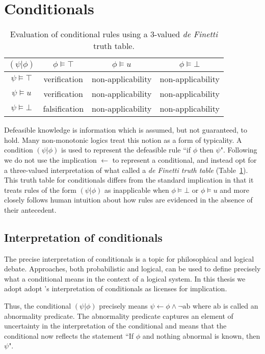 \section{Conditionals} \label{ssec:condi}
\begin{table}
\begin{center}
\begin{tabular}{ c | c c c }
  $(\psi|\phi)$& $\phi\models \top$ & $\phi \models u$ & $\phi \models \bot$ \\ \hline
 $\psi\models \top$ & verification &  non-applicability & non-applicability \\  
  $\psi\models u$ & verification &  non-applicability & non-applicability \\ 
 $\psi \models \bot$ & falsification &  non-applicability & non-applicability
\end{tabular}
\caption{Evaluation of conditional rules using a 3-valued \textit{de Finetti} truth table.}
\label{tbl:cond}
\end{center}
\end{table}

Defeasible knowledge is information which is assumed, but not guaranteed, to hold. Many non-monotonic logics treat this notion as a form of typicality. A condition $(\psi|\phi)$ is used to represent the defeasible rule ``if $\phi$ then $\psi$". Following \cite{wason1968reasoning} we do not use the implication $\leftarrow$ to represent a conditional, and instead opt for a three-valued interpretation of what \cite{baratgin2014new} called a \textit{de Finetti truth table} (Table~\ref{tbl:cond}). This truth table for conditionals differs from the standard implication in that it treats rules of the form $(\psi|\phi)$ as inapplicable when $\phi \models \bot$ or $\phi \models u$ and more closely follows human intuition about how rules are evidenced in the absence of their antecedent.

\subsection{Interpretation of conditionals} \label{ssec:condInterpretation}
The precise interpretation of conditionals is a topic for philosophical and logical debate. Approaches, both probabilistic and logical, can be used to define precisely what a conditional means in the context of a logical system. In this thesis we adopt adopt \cite{stenning2008interpretation}'s interpretation of conditionals as licenses for implication. 

Thus, the conditional $(\psi|\phi)$ precisely means $\psi \leftarrow \phi \land \lnot \text{ab}$ where $\text{ab}$ is called an abnormality predicate. The abnormality predicate captures an element of uncertainty in the interpretation of the conditional and means that the conditional now reflects the statement ``If $\phi$ and nothing abnormal is known, then $\psi$".

